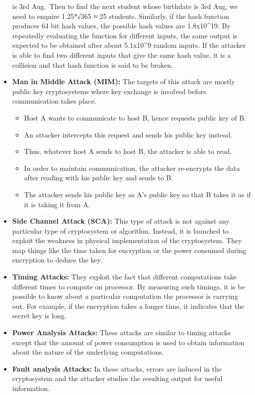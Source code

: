 \documentclass[11pt]{article}
\providecommand{\tightlist}{%
      \setlength{\itemsep}{0pt}\setlength{\parskip}{0pt}}
\begin{document}
\begin{itemize}
  is 3rd Aug.~Then to find the next student whose birthdate is 3rd Aug,
  we need to enquire 1.25*√365 ≈ 25 students. Similarly, if the hash
  function produces 64 bit hash values, the possible hash values are
  1.8x10\^{}19. By repeatedly evaluating the function for different
  inputs, the same output is expected to be obtained after about
  5.1x10\^{}9 random inputs. If the attacker is able to find two
  different inputs that give the same hash value, it is a collision and
  that hash function is said to be broken.
\item
  \textbf{Man in Middle Attack (MIM):} The targets of this attack are
  mostly public key cryptosystems where key exchange is involved before
  communication takes place.

  \begin{itemize}
  \tightlist
  \item
    Host A wants to communicate to host B, hence requests public key of
    B.
  \item
    An attacker intercepts this request and sends his public key
    instead.
  \item
    Thus, whatever host A sends to host B, the attacker is able to read.
  \item
    In order to maintain communication, the attacker re-encrypts the
    data after reading with his public key and sends to B.
  \item
    The attacker sends his public key as A's public key so that B takes
    it as if it is taking it from A.
  \end{itemize}
\item
  \textbf{Side Channel Attack (SCA):} This type of attack is not against
  any particular type of cryptosystem or algorithm. Instead, it is
  launched to exploit the weakness in physical implementation of the
  cryptosystem. They map things like the time taken for encryption or
  the power consumed during encryption to deduce the key.
\item
  \textbf{Timing Attacks:} They exploit the fact that different
  computations take different times to compute on processor. By
  measuring such timings, it is be possible to know about a particular
  computation the processor is carrying out. For example, if the
  encryption takes a longer time, it indicates that the secret key is
  long.
\item
  \textbf{Power Analysis Attacks:} These attacks are similar to timing
  attacks except that the amount of power consumption is used to obtain
  information about the nature of the underlying computations.
\item
  \textbf{Fault analysis Attacks:} In these attacks, errors are induced
  in the cryptosystem and the attacker studies the resulting output for
  useful information.
\end{itemize}
\end{document}

